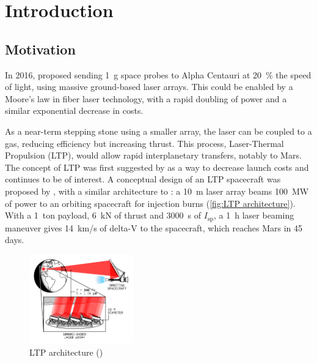 \chapter{Introduction} \label{chp:intro}
    
    \section{Motivation}

        In 2016, \textcite{lubinRoadmapInterstellarFlight2016} proposed sending \qty{1}{g} space probes to Alpha Centauri at \qty{20}{\%} the speed of light, using massive ground-based laser arrays. This could be enabled by a Moore's law in fiber laser technology, with a rapid doubling of power and a similar exponential decrease in costs.
        
        As a near-term stepping stone using a smaller array, the laser can be coupled to a gas, reducing efficiency but increasing thrust. This process, Laser-Thermal Propulsion (LTP), would allow rapid interplanetary transfers, notably to Mars. The concept of LTP was first suggested by \textcite{kantrowitzRelevanceSpace1971} as a way to decrease launch costs and continues to be of interest. A conceptual design of an LTP spacecraft was proposed by \textcite{duplayDesignRapidTransit2022a}, with a similar architecture to \textcite{lubinRoadmapInterstellarFlight2016}: a \qty{10}{m} laser array beams \qty{100}{MW} of power to an orbiting spacecraft for injection burns (\autoref{fig:LTP architecture}). With a \qty{1}{ton} payload, \qty{6}{kN} of thrust and \qty{3000}{s} of $I_\mathrm{sp}$, a \qty{1}{h} laser beaming maneuver gives \qty{14}{km/s} of delta-V to the spacecraft, which reaches Mars in 45 days.

        \begin{figure}[!ht]
            \centering
            \includegraphics[width=0.4\textwidth]{assets/2 background/ltp_architecture.pdf}
            \caption{LTP architecture (\textcite{duplayArgonLaserPlasmaThruster2024a})}
            \label{fig:LTP architecture}
        \end{figure}

